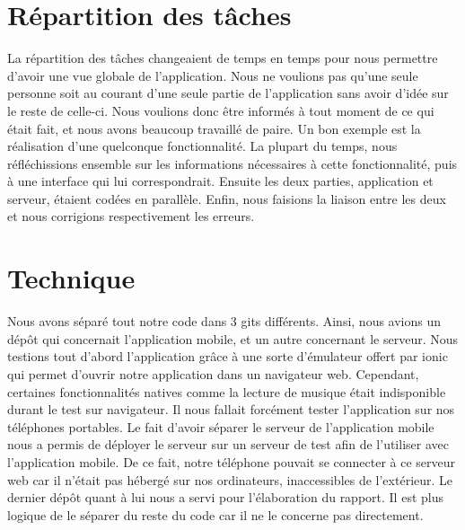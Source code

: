 \documentclass[pidr]{tnreport}
\begin{document}
\section{Répartition des tâches}

La répartition des tâches changeaient de temps en temps pour nous permettre d’avoir une vue globale de l’application. Nous ne voulions pas qu’une seule personne soit au courant d’une seule partie de l’application sans avoir d’idée sur le reste de celle-ci. Nous voulions donc être informés à tout moment de ce qui était fait, et nous avons beaucoup travaillé de paire. Un bon exemple est la réalisation d’une quelconque fonctionnalité. La plupart du temps, nous réfléchissions ensemble sur les informations nécessaires à cette fonctionnalité, puis à une interface qui lui correspondrait. Ensuite les deux parties, application et serveur, étaient codées en parallèle. Enfin, nous faisions la liaison entre les deux et nous corrigions respectivement les erreurs.


\section{Technique}

Nous avons séparé tout notre code dans 3 gits différents. Ainsi, nous avions un dépôt qui concernait l’application mobile, et un autre concernant le serveur. Nous testions tout d’abord l’application grâce à une sorte d’émulateur offert par ionic qui permet d’ouvrir notre application dans un navigateur web. Cependant, certaines fonctionnalités natives comme la lecture de musique était indisponible durant le test sur navigateur. Il nous fallait forcément tester l’application sur nos téléphones portables. Le fait d’avoir séparer le serveur de l’application mobile nous a permis de déployer le serveur sur un serveur de test afin de l’utiliser avec l’application mobile. De ce fait, notre téléphone pouvait se connecter à ce serveur web car il n’était pas hébergé sur nos ordinateurs, inaccessibles de l’extérieur. Le dernier dépôt quant à lui nous a servi pour l’élaboration du rapport. Il est plus logique de le séparer du reste du code car il ne le concerne pas directement.
\end{document}
